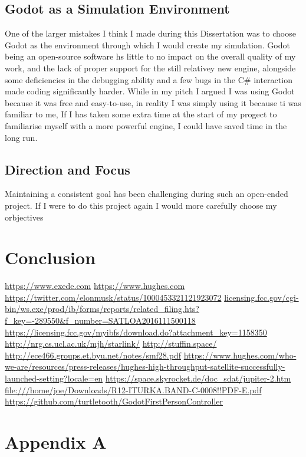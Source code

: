 \documentclass[12pt]{article}
\begin{document}

\subsection{Godot as a Simulation Environment}

One of the larger mistakes I think I made during this Dissertation was to choose Godot as the environment through which I would create my simulation. Godot being an open-source software hs little to no impact on the overall quality of my work, and the lack of proper support for the still relativey new engine, alongside some deficiencies in the debugging ability and a few bugs in the C\# interaction made coding significantly harder. While in my pitch I argued I was using Godot because it was free and easy-to-use, in reality I was simply using it because ti was familiar to me, If I has taken some extra time at the start of my progect to familiarise myself with a more powerful engine, I could have saved time in the long run.

\subsection{Direction and Focus}

Maintaining a consistent goal has been challenging during such an open-ended project. If I were to do this project again I would more carefully choose my orbjectives %

\section{Conclusion}


\begin{thebibliography}{99}
	 \url{https://www.exede.com}
	 \url{https://www.hughes.com}
	 \url{https://twitter.com/elonmusk/status/1000453321121923072}
	 \url{licensing.fcc.gov/cgi-bin/ws.exe/prod/ib/forms/reports/related_filing.hts?f_key=-289550&f_number=SATLOA2016111500118}
	 \url{https://licensing.fcc.gov/myibfs/download.do?attachment_key=1158350}
	 \url{http://nrg.cs.ucl.ac.uk/mjh/starlink/}
	 \url{http://stuffin.space/}
	 \url{http://ece466.groups.et.byu.net/notes/smf28.pdf}
	 \url{https://www.hughes.com/who-we-are/resources/press-releases/hughes-high-throughput-satellite-successfully-launched-setting?locale=en}
	 \url{https://space.skyrocket.de/doc_sdat/jupiter-2.htm}
	 \url{file:///home/joe/Downloads/R12-ITURKA.BAND-C-0008!!PDF-E.pdf}
	 \url{https://github.com/turtletooth/GodotFirstPersonController}
\end{thebibliography}
\appendix

\section{Appendix A}

\printindex

\end{document}
